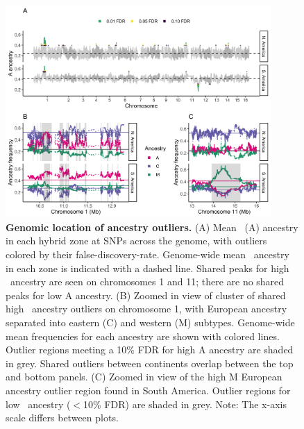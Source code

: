 \begin{figure}[ht]
\begin{center}
\includegraphics[width=0.9\textwidth]{chapter1/figures/A_outliers_grob.png}
\end{center}
\caption{ \textbf{Genomic location of ancestry outliers.} (A) Mean \scutellata\ (A) ancestry in each hybrid zone at SNPs across the genome, with outliers colored by their false-discovery-rate. Genome-wide mean \A\ ancestry in each zone is indicated with a dashed line. Shared peaks for high \A\ ancestry are seen on chromosomes 1 and 11; there are no shared peaks for low A ancestry. (B) Zoomed in view of cluster of shared high \A\ ancestry outliers on chromosome 1, with European ancestry separated into eastern (C) and western (M) subtypes. Genome-wide mean frequencies for each ancestry are shown with colored lines. Outlier regions meeting a 10\% FDR for high A ancestry are shaded in grey. Shared outliers between continents overlap between the top and bottom panels. (C) Zoomed in view of the high M European ancestry outlier region found in South America. Outlier regions for low \A\ ancestry ($<$10\% FDR) are shaded in grey. Note: The x-axis scale differs between plots.}
\label{peaks}
\end{figure}

